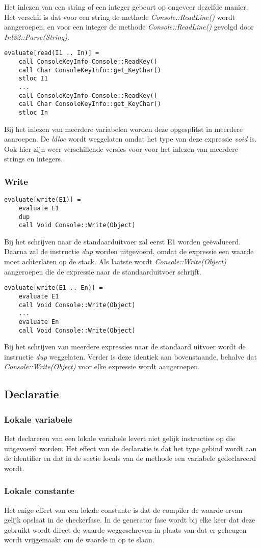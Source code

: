 Het inlezen van een string of een integer gebeurt op ongeveer dezelfde manier. Het verschil is dat voor een string de methode \textit{Console::ReadLine()} wordt aangeroepen, en voor een integer de methode \textit{Console::ReadLine()} gevolgd door \textit{Int32::Parse(String)}.

\begin{lstlisting}
evaluate[read(I1 .. In)] =
	call ConsoleKeyInfo Console::ReadKey()
	call Char ConsoleKeyInfo::get_KeyChar()
	stloc I1
	...
	call ConsoleKeyInfo Console::ReadKey()
	call Char ConsoleKeyInfo::get_KeyChar()
	stloc In
\end{lstlisting}
Bij het inlezen van meerdere variabelen worden deze opgesplitst in meerdere aanroepen. De \textit{ldloc} wordt weggelaten omdat het type van deze expressie \textit{void} is. Ook hier zijn weer verschillende versies voor voor het inlezen van meerdere strings en integers.

\subsubsection{Write}
\begin{lstlisting}
evaluate[write(E1)] =
	evaluate E1
	dup
	call Void Console::Write(Object)
\end{lstlisting}
Bij het schrijven naar de standaarduitvoer zal eerst E1 worden ge\"evalueerd. Daarna zal de instructie \textit{dup} worden uitgevoerd, omdat de expressie een waarde moet achterlaten op de stack. Als laatste wordt \textit{Console::Write(Object)} aangeroepen die de expressie naar de standaarduitvoer schrijft.

\begin{lstlisting}
evaluate[write(E1 .. En)] =
	evaluate E1
	call Void Console::Write(Object)
	...
	evaluate En
	call Void Console::Write(Object)
\end{lstlisting}
Bij het schrijven van meerdere expressies naar de standaard uitvoer wordt de instructie \textit{dup} weggelaten. Verder is deze identiek aan bovenstaande, behalve dat \textit{Console::Write(Object)} voor elke expressie wordt aangeroepen.

\subsection{Declaratie}
\subsubsection{Lokale variabele}
Het declareren van een lokale variabele levert niet gelijk instructies op die uitgevoerd worden. Het effect van de declaratie is dat het type gebind wordt aan de identifier en dat in de sectie locals van de methode een variabele gedeclareerd wordt.

\subsubsection{Lokale constante}
Het enige effect van een lokale constante is dat de compiler de waarde ervan gelijk opslaat in de checkerfase. In de generator fase wordt bij elke keer dat deze gebruikt wordt direct de waarde weggeschreven in plaats van dat er geheugen wordt vrijgemaakt om de waarde in op te slaan.